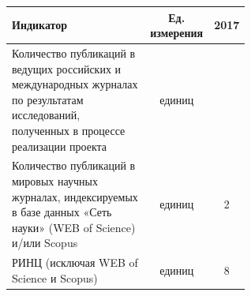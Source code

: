 \documentclass[a4paper,12pt,openany,final]{extreport}
\makeatletter
\newcommand\theyear{2017}
\def\vhrulefill#1{\leavevmode\leaders\hrule\@height#1\hfill \kern\z@}
\newcommand\toprule{\noindent\vhrulefill{2pt}}
\newcommand\T{\rule{0pt}{2.6ex}}       %
\makeatother
\begin{document}

\begin{center}
\begin{tabular}[]{|>{\raggedright}m{0.6\linewidth}|c|c|}
\hline
\T\centering Индикатор & Ед. измерения & \theyear\tabularnewline\hline
\T Количество публикаций в ведущих российских и международных журналах по
результатам исследований, полученных в процессе реализации проекта &
единиц &\tabularnewline\hline
\T Количество публикаций в мировых научных журналах, индексируемых в базе
данных «Сеть науки» (WEB of Science) и/или Scopus & единиц &
2\tabularnewline\hline
\T РИНЦ (исключая WEB of Science и Scopus) & единиц & 8\tabularnewline\hline
\end{tabular}
\end{center}


\end{document}
